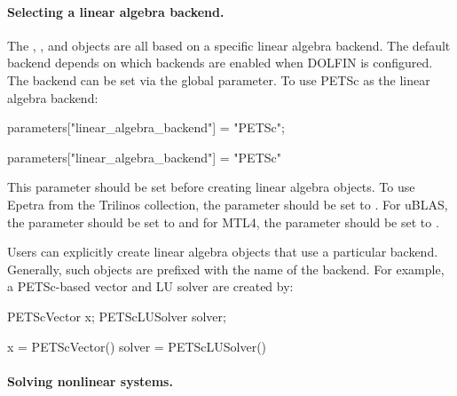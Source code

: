 \paragraph{Selecting a linear algebra backend.}

The , ,  and 
objects are all based on a specific linear algebra backend.
The default backend depends on which backends are enabled when DOLFIN
is configured.  The backend can be set via the global
parameter\break {}.  To use PETSc as the linear
algebra backend:
\begin{c++}
parameters["linear_algebra_backend"] = "PETSc";
\end{c++}
\begin{python}
parameters["linear_algebra_backend"] = "PETSc"
\end{python}
This parameter should be set before creating linear algebra
objects. To use Epetra from the Trilinos collection, the parameter
 should be set to .
For uBLAS, the parameter should be set to  and for MTL4, the
parameter should be set to .

Users can explicitly create linear algebra objects that use a
particular backend. Generally, such objects are prefixed with the name
of the backend. For example, a PETSc-based vector and LU solver are
created by:
\begin{c++}
PETScVector x;
PETScLUSolver solver;
\end{c++}
\begin{python}
x = PETScVector()
solver = PETScLUSolver()
\end{python}


\paragraph{Solving nonlinear systems.}

